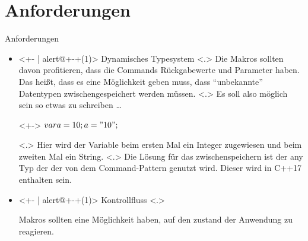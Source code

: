 \section{Anforderungen}
  \begin{frame}{Anforderungen}
    \begin{itemize}
      \item<+- | alert@+-+(1)>
        Dynamisches Typesystem
            \note[item]<.>{
              Die Makros sollten davon profitieren, dass die Commands Rückgabewerte und Parameter haben. Das heißt, dass es eine Möglichkeit geben muss, dass ``unbekannte'' Datentypen zwischengespeichert werden müssen.
            }
            \note[item]<.>{
              Es soll also möglich sein so etwas zu schreiben \ldots
            }
        \begin{uncoverenv}<+->%
          \tabto{4.5cm}
          \myMIn$var a = 10; a = "10";$
        \end{uncoverenv}
            \note[item]<.>{
              Hier wird der Variable  beim ersten Mal ein Integer zugewiesen und beim zweiten Mal ein String.
            }
            \note[item]<.>{
              Die Lösung für das zwischenspeichern ist der any Typ der der von dem Command-Pattern genutzt wird. Dieser wird in C++17 enthalten sein.
            }
      \item<+- | alert@+-+(1)>
        Kontrollfluss
            \note[item]<.>{
              Makros sollten eine Möglichkeit haben, auf den zustand der Anwendung zu reagieren.

}
\end{itemize}
\end{frame}
